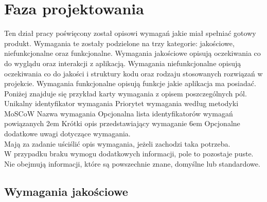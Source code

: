 \newcommand{\tabeladwiekolumnywiersz}[2]{
    \parbox[c][1em][c]{\textwidth}{
        #1
    } &
    \parbox[c][2.5em][c]{\textwidth}{
        #2
    }
    \\
    \hline
}

\newcommand{\tabeladwiekolumny}[3]{
    \begin{center}
        \begin{tabularx}{1\textwidth} {
                | >{\hsize=#1\hsize}X
                | >{\hsize=#2\hsize}X |}
            \hline

            #3
        \end{tabularx}
    \end{center}
}

\newcommand{\tabeladwiekolumnywykres}[3]{
    \tabeladwiekolumnywiersz{
        #1
    }{
        \rule{30.3em / #3 * #2}{1.2em}
    }
}

\section{Faza projektowania}
Ten dział pracy poświęcony został opisowi wymagań jakie miał spełniać gotowy produkt. Wymagania te zostały podzielone na trzy kategorie: jakościowe, niefunkcjonalne oraz funkcjonalne. Wymagania jakościowe opisują oczekiwania co do wyglądu oraz interakcji z aplikacją. Wymagania niefunkcjonalne opisują oczekiwania co do jakości i struktury kodu oraz rodzaju stosowanych rozwiązań w projekcie. Wymagania funkcjonalne opisują funkcje jakie aplikacja ma posiadać.\\

Poniżej znajduje się przykład karty wymagania z opisem poszczególnych pól.
\wymaganie
{Unikalny identyfikator wymagania}
{Priorytet wymagania według metodyki MoSCoW}
{Nazwa wymagania}
{Opcjonalna lista identyfikatorów wymagań powiązanych}
{2em}{
    Krótki opis przedstawiający wymaganie
}
{6em}{
    Opcjonalne dodatkowe uwagi dotyczące wymagania.\\
    Mają za zadanie uściślić opis wymagania, jeżeli zachodzi taka potrzeba.\\
    W przypadku braku wymogu dodatkowych informacji, pole to pozostaje puste.\\
    Nie obejmują informacji, które są powszechnie znane, domyślne lub standardowe.
}

\subsection{Wymagania jakościowe}

